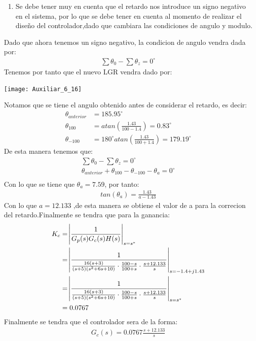 \documentclass[
  11pt,
  letterpaper,
   addpoints,
   answers
  ]{exam}
\begin{document}
\begin{questions}
\begin{solution}
\begin{enumerate}
    \item Se debe tener muy en cuenta que el retardo nos introduce un signo negativo en el sistema, por lo que se debe tener en cuenta al momento de realizar el diseño del controlador,dado que cambiara las condiciones de angulo y modulo.
\end{enumerate}
Dado que ahora tenemos un signo negativo, la condicion de angulo vendra dada por:
\begin{align}
    \sum \theta_{0} - \sum \theta_{z} = 0^{\circ}
\end{align}
Tenemos por tanto que el nuevo LGR vendra dado por:
\begin{center}
    \texttt{[image: Auxiliar\_6\_16]}
\end{center}
Notamos que se tiene el angulo obtenido antes de considerar el retardo, es decir:
\begin{align}
    \theta_{anterior} &= 185.95^{\circ}\\
    \theta_{100} &= atan\left(\frac{1.43}{100-1.4}\right) = 0.83^{\circ}\\
    \theta_{-100} &= 180^{\circ} atan\left(\frac{1.43}{100+1.4}\right) = 179.19^{\circ}
\end{align}
De esta manera tenemos que:
\begin{align}
    \sum \theta_{0} - \sum \theta_{z} = 0^{\circ}\\
    \theta_{anterior} + \theta_{100} - \theta_{-100} - \theta_{a} = 0^{\circ}\\
\end{align}
Con lo que se tiene que $\theta_{a}= 7.59$, por tanto:
\begin{align}
    tan(\theta_{a}) = \frac{1.43}{a-1.43}
\end{align}
Con lo que $a = 12.133$ ,de esta manera se obtiene el valor de a para la correcion del retardo.Finalmente se tendra que para la ganancia:
\begin{align}
    K_{c} &= \abs{\frac{1}{G_{p}(s)G_{c}(s)H(s)}}_{s=s^{*}}\\
          &= \abs{\frac{1}{\frac{16(s+3)}{(s+5)(s^{2}+6s+10)}\cdot \frac{100-s}{100+s}\cdot \frac{s+12.133}{s}}}_{s=-1.4+j1.43}\\
          &= \abs{\frac{1}{\frac{16(s+3)}{(s+5)(s^{2}+6s+10)}\cdot \frac{100-s}{100+s}\cdot \frac{s+12.133}{s}}}_{s=s^{*}}\\
          &= 0.0767
\end{align}
Finalmente se tendra que el controlador sera de la forma:
\begin{align}
    G_{c}(s) = 0.0767\frac{s+12.133}{s}
\end{align}

\end{solution}
\end{questions}
\end{document}
